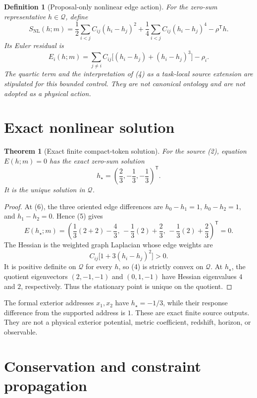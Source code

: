 \documentclass[11pt]{article}
\newtheorem{definition}{Definition}
\newtheorem{theorem}{Theorem}
\newcommand{\Qspace}{\mathcal Q}
\begin{document}
\begin{definition}[Proposal-only nonlinear edge action]
For the zero-sum representative \(h\in\Qspace\), define
\[
 S_{\mathrm{NL}}(h;m)
 =\frac12\sum_{i<j}C_{ij}(h_i-h_j)^2
 +\frac14\sum_{i<j}C_{ij}(h_i-h_j)^4
 -\rho^{\mathsf T}h .
 \tag{4}
\]
Its Euler residual is
\[
 E_i(h;m)=
 \sum_{j\ne i}C_{ij}
 \bigl[(h_i-h_j)+(h_i-h_j)^3\bigr]-\rho_i .
 \tag{5}
\]
The quartic term and the interpretation of (4) as a task-local source
extension are stipulated for this bounded control.  They are not canonical
ontology and are not adopted as a physical action.
\end{definition}

\section{Exact nonlinear solution}

\begin{theorem}[Exact finite compact-token solution]
\label{thm:exact-solution}
For the source (2), equation \(E(h;m)=0\) has the exact zero-sum solution
\[
 h_\star=
 \left(\frac23,-\frac13,-\frac13\right)^{\mathsf T}.
 \tag{6}
\]
It is the unique solution in \(\Qspace\).
\end{theorem}

\begin{proof}
At (6), the three oriented edge differences are
\(h_0-h_1=1\), \(h_0-h_2=1\), and \(h_1-h_2=0\).  Hence (5) gives
\[
 E(h_\star;m)=
 \left(\frac13(2+2)-\frac43,\,
       -\frac13(2)+\frac23,\,
       -\frac13(2)+\frac23\right)^{\mathsf T}=0.
\]
The Hessian is the weighted graph Laplacian whose edge weights are
\[
 C_{ij}\bigl[1+3(h_i-h_j)^2\bigr]>0 .
\]
It is positive definite on \(\Qspace\) for every \(h\), so (4) is strictly
convex on \(\Qspace\).  At \(h_\star\), the quotient eigenvectors
\((2,-1,-1)\) and \((0,1,-1)\) have Hessian eigenvalues \(4\) and \(2\),
respectively.  Thus the stationary point is unique on the quotient.
\end{proof}

The formal exterior addresses \(x_1,x_2\) have
\(h_\star=-1/3\), while their response difference from the supported address
is \(1\).  These are exact finite source outputs.  They are not a physical
exterior potential, metric coefficient, redshift, horizon, or observable.

\section{Conservation and constraint propagation}
\end{document}
